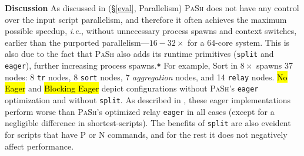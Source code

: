 \documentclass[sigplan, review, screen, anonymous]{acmart}
\newcommand{\eg}{{\em e.g.}, }
\newcommand{\ie}{{\em i.e.}, }
\newcommand{\heading}[1]{\vspace{4pt}\noindent\textbf{#1}\enspace}
\newcommand{\ttt}[1]{\texttt{#1}}
\newcommand{\cn}[1]{\mbox{\textcircled{\footnotesize #1}}}
\newcommand{\tcn}[1]{\mbox{\textcircled{\scriptsize #1}}}
\newcommand{\pur}{\cn{\textsc{P}}\xspace}
\newcommand{\tpur}{\tcn{\textsc{P}}\xspace}
\newcommand{\tnpu}{\tcn{\textsc{N}}\xspace}
\newcommand{\todo}[1]{\hl{#1}\xspace}
\newcommand{\kk}[1]{[{\color{magenta}kk: #1}]}
\newcommand{\str}{{\color{red}\textbf{\ttt{*}}}}
\newcommand{\sys}{{\scshape PaSh}\xspace}
\begin{document}
\heading{Discussion}
%
As discussed in (\S\ref{eval}, Parallelism) \sys does not have any control over the input script parallelism, and therefore it often achieves the maximum possible speedup, \ie without unnecessary process spawns and context switches, earlier than the purported parallelism---$16-32\times$ for a 64-core system. This is also due to the fact that \sys also adds its runtime primitives (\ttt{split} and \ttt{eager}), further increasing process spawns.\str
For example, Sort in $8\times$ spawns 37 nodes:
  8 \ttt{tr} nodes, 8 \ttt{sort} nodes, 7 \emph{aggregation} nodes, and 14 \ttt{relay} nodes.
% 
\todo{No Eager} and \todo{Blocking Eager} depict configurations without \sys's \ttt{eager} optimization and without \ttt{split}. As described in , these eager implementations perform worse than \sys's optimized relay \ttt{eager} in all cases (except for a negligible difference in shortest-scripts). The benefits of \ttt{split} are also eveident for scripts that have \tpur or \tnpu commands, and for the rest it does not negatively affect performance. 
\end{document}
